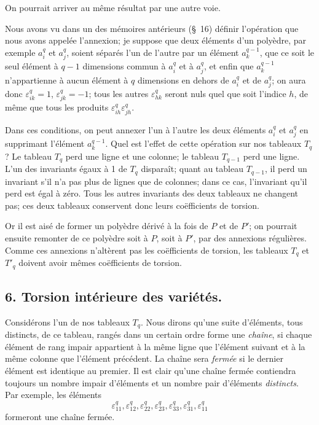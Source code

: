 \documentclass{article}
\begin{document}
On pourrait arriver au même résultat par une autre voie.

Nous avons vu dans un des mémoires antérieurs (\S~16) définir l'opération que nous avons appelée l'annexion; je suppose que deux éléments d'un polyèdre, par exemple $a^{q}_{i}$ et $a^{q}_{j}$, soient séparés l'un de l'autre par un élément $a^{q-1}_{k}$, que ce soit le seul élément à $q-1$ dimensions commun à $a^{q}_{i}$ et à $a^{q}_{j}$, et enfin que $a^{q-1}_{k}$ n'appartienne à aucun élément à $q$ dimensions en dehors de $a^{q}_{i}$ et de $a^{q}_{j}$; on aura donc $\varepsilon^{q}_{ik} = 1$, $\varepsilon^{q}_{jk} = -1$; tous les autres $\varepsilon^{q}_{hk}$ seront nuls quel que soit l'indice $h$, de même que tous les produits $\varepsilon^{q}_{ih} \varepsilon^{q}_{jh}$.

Dans ces conditions, on peut annexer l'un à l'autre les deux éléments $a^{q}_{i}$ et $a^{q}_{j}$ en supprimant l'élément $a^{q-1}_{k}$. Quel est l'effet de cette opération sur nos tableaux $T_{q}$? Le tableau $T_{q}$ perd une ligne et une colonne; le tableau $T_{q-1}$ perd une ligne. L'un des invariants égaux à 1 de $T_{q}$ disparaît; quant au tableau $T_{q-1}$, il perd un invariant s'il n'a
pas plus de lignes que de colonnes; dans ce cas, l'invariant qu'il perd est égal à zéro. Tous les autres invariants des deux tableaux ne changent pas; ces deux tableaux conservent donc leurs coëfficients de torsion.

Or il est aisé de former un polyèdre dérivé à la fois de $P$ et de $P'$; on pourrait ensuite remonter de ce polyèdre soit à $P$, soit à $P'$, par des annexions régulières. Comme ces annexions n'altèrent pas les coëfficients de torsion, les tableaux $T_{q}$ et $T'_{q}$ doivent avoir mêmes coëfficients de torsion.

\subsection*{6. Torsion intérieure des variétés.}

Considérons l'un de nos tableaux $T_{q}$. Nous dirons qu'une suite d'éléments, tous distincts, de ce tableau, rangés dans un certain ordre forme une \emph{chaîne}, si chaque élément de rang impair appartient à la même ligne que l'élément suivant et à la même colonne que l'élément précédent. La chaîne sera \emph{fermée} si le dernier élément est identique au premier. Il est clair qu'une chaîne fermée contiendra toujours un nombre impair d'éléments et un nombre pair d'éléments \emph{distincts}. Par exemple, les éléments
\[ \varepsilon^{q}_{11}, \varepsilon^{q}_{12}, \varepsilon^{q}_{22}, \varepsilon^{q}_{23}, \varepsilon^{q}_{33}, \varepsilon^{q}_{31}, \varepsilon^{q}_{11} \tag{1} \]
formeront une chaîne fermée.
\end{document}
